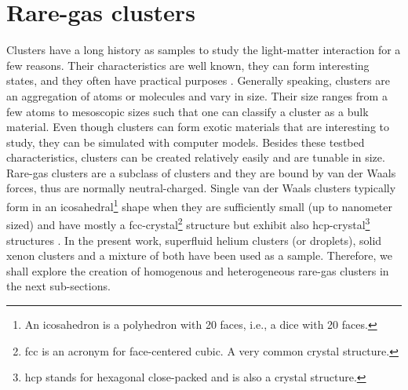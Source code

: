 \section{Rare-gas clusters}\label{sec:cluster-theory}
Clusters have a long history as samples to study the light-matter interaction for a few reasons. Their characteristics are well known, they can form interesting states, and they often have practical purposes \cite{Haberland-1994-Springer}. Generally speaking, clusters are an aggregation of atoms or molecules and vary in size. Their size ranges from a few atoms to mesoscopic sizes such that one can classify a cluster as a bulk material. Even though clusters can form exotic materials that are interesting to study, they can be simulated with computer models. Besides these testbed characteristics, clusters can be created relatively easily and are tunable in size. Rare-gas clusters are a subclass of clusters and they are bound by van der Waals forces, thus are normally neutral-charged. Single van der Waals clusters typically form in an icosahedral\footnote{An icosahedron is a polyhedron with 20 faces, i.e., a dice with 20 faces.} shape when they are sufficiently small (up to nanometer sized) \cite{Miehle-1989-JCP} and have mostly a fcc-crystal\footnote{fcc is an acronym for face-centered cubic. A very common crystal structure.} structure but exhibit also hcp-crystal\footnote{hcp stands for hexagonal close-packed and is also a crystal structure.} structures \cite{VanDeWaal-1993-JCP,Krainyukova-2006-TSF}. In the present work, superfluid helium clusters (or droplets), solid xenon clusters and a mixture of both have been used as a sample. Therefore, we shall explore the creation of homogenous and heterogeneous rare-gas clusters in the next sub-sections.
%
%
%
